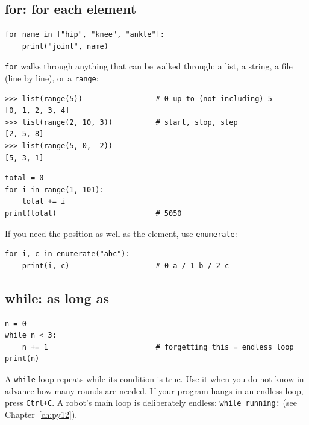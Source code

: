 \subsection*{for: for each element}
\begin{verbatim}
for name in ["hip", "knee", "ankle"]:
    print("joint", name)
\end{verbatim}
\texttt{for} walks through anything that can be walked through: a list, a string, a file (line by line), or a \texttt{range}:
\begin{verbatim}
>>> list(range(5))                 # 0 up to (not including) 5
[0, 1, 2, 3, 4]
>>> list(range(2, 10, 3))          # start, stop, step
[2, 5, 8]
>>> list(range(5, 0, -2))
[5, 3, 1]
\end{verbatim}
\begin{verbatim}
total = 0
for i in range(1, 101):
    total += i
print(total)                       # 5050
\end{verbatim}
If you need the position as well as the element, use \texttt{enumerate}:
\begin{verbatim}
for i, c in enumerate("abc"):
    print(i, c)                    # 0 a / 1 b / 2 c
\end{verbatim}

\subsection*{while: as long as}
\begin{verbatim}
n = 0
while n < 3:
    n += 1                         # forgetting this = endless loop
print(n)
\end{verbatim}
A \texttt{while} loop repeats while its condition is true. Use it when you do not know in advance how many rounds are needed. If your program hangs in an endless loop, press \texttt{Ctrl+C}. A robot's main loop is deliberately endless: \verb!while running:! (see Chapter~\ref{ch:py12}).

\begin{center}
\label{fig:py2_while}
\end{center}

